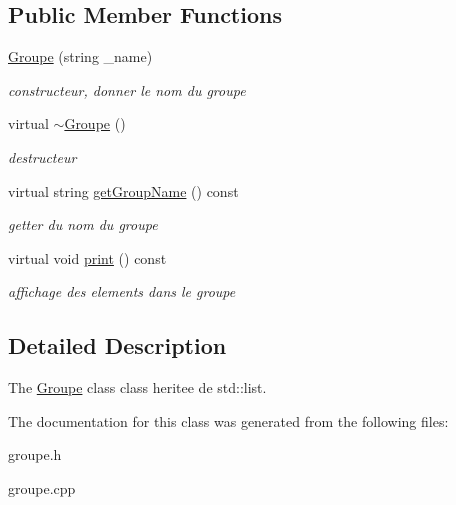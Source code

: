 \subsection*{Public Member Functions}
\begin{DoxyCompactItemize}
\item 
\hypertarget{classGroupe_ad4cd49f43b43c2a0abfc7b283f37e9bc}{\hyperlink{classGroupe_ad4cd49f43b43c2a0abfc7b283f37e9bc}{Groupe} (string \-\_\-name)}\label{classGroupe_ad4cd49f43b43c2a0abfc7b283f37e9bc}

\begin{DoxyCompactList}\small\item\em constructeur, donner le nom du groupe \end{DoxyCompactList}\item 
\hypertarget{classGroupe_a99dd414922635dcc0585aabb2a330f63}{virtual \hyperlink{classGroupe_a99dd414922635dcc0585aabb2a330f63}{$\sim$\-Groupe} ()}\label{classGroupe_a99dd414922635dcc0585aabb2a330f63}

\begin{DoxyCompactList}\small\item\em destructeur \end{DoxyCompactList}\item 
\hypertarget{classGroupe_a37f0f8e74f1826265933503de8a45583}{virtual string \hyperlink{classGroupe_a37f0f8e74f1826265933503de8a45583}{get\-Group\-Name} () const }\label{classGroupe_a37f0f8e74f1826265933503de8a45583}

\begin{DoxyCompactList}\small\item\em getter du nom du groupe \end{DoxyCompactList}\item 
\hypertarget{classGroupe_aaf187c7b1df6740b05cae4e504a83874}{virtual void \hyperlink{classGroupe_aaf187c7b1df6740b05cae4e504a83874}{print} () const }\label{classGroupe_aaf187c7b1df6740b05cae4e504a83874}

\begin{DoxyCompactList}\small\item\em affichage des elements dans le groupe \end{DoxyCompactList}\end{DoxyCompactItemize}


\subsection{Detailed Description}
The \hyperlink{classGroupe}{Groupe} class class heritee de std\-::list. 

The documentation for this class was generated from the following files\-:\begin{DoxyCompactItemize}
\item 
groupe.\-h\item 
groupe.\-cpp\end{DoxyCompactItemize}
